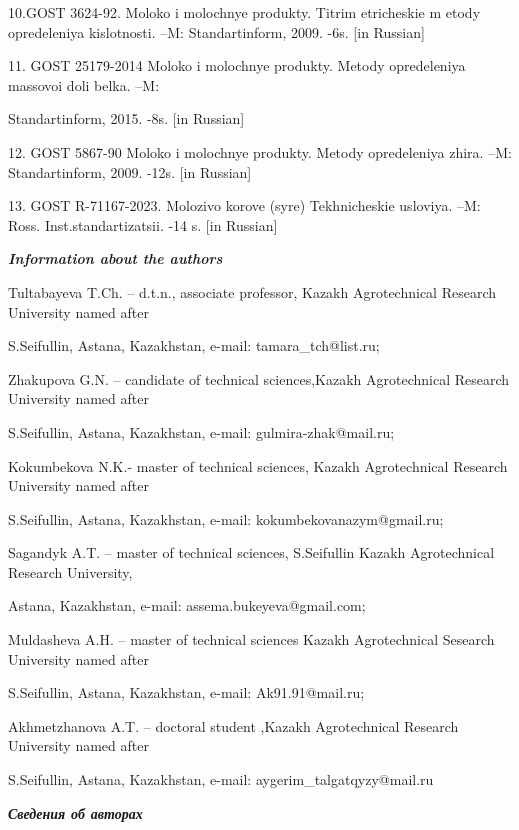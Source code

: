 \begin{noparindent}
10.GOST 3624-92. Moloko i molochnye produkty. Titrim etricheskie m etody
opredeleniya kislotnosti. --M: Standartinform, 2009. -6s. {[}in
Russian{]}

11. GOST 25179-2014 Moloko i molochnye produkty. Metody opredeleniya
massovoi doli belka. --M:

Standartinform, 2015. -8s. {[}in Russian{]}

12. GOST 5867-90 Moloko i molochnye produkty. Metody opredeleniya zhira.
--M: Standartinform, 2009. -12s. {[}in Russian{]}

13. GOST R-71167-2023. Molozivo korov\textquotesingle\textquotesingle e
(syr\textquotesingle\textquotesingle e) Tekhnicheskie usloviya. --M:
Ross. Inst.standartizatsii. -14 s. {[}in Russian{]}
\end{noparindent}

\emph{{\bfseries Information about the authors}}

\begin{noparindent}
Tultabayeva T.Ch. -- d.t.n., associate professor, Kazakh Agrotechnical
Research University named after

S.Seifullin, Astana, Kazakhstan, e-mail:
tamara\_tch@list.ru;

Zhakupova G.N. -- candidate of technical sciences,Kazakh Agrotechnical
Research University named after

S.Seifullin, Astana, Kazakhstan, e-mail:
gulmira-zhak@mail.ru;

Kokumbekova N.K.- master of technical sciences, Kazakh Agrotechnical
Research University named after

S.Seifullin, Astana, Kazakhstan, e-mail:
kokumbekovanazym@gmail.ru;

Sagandyk A.T. -- master of technical sciences, S.Seifullin Kazakh
Agrotechnical Research University,

Astana, Kazakhstan, e-mail:
assema.bukeyeva@gmail.com;

Muldasheva A.H. -- master of technical sciences Kazakh Agrotechnical
Sesearch University named after

S.Seifullin, Astana, Kazakhstan, e-mail:
Ak91.91@mail.ru;

Akhmetzhanova A.T. -- doctoral student ,Kazakh Agrotechnical Research
University named after

S.Seifullin, Astana, Kazakhstan, e-mail:
aygerim\_talgatqyzy@mail.ru
\end{noparindent}

\emph{{\bfseries Сведения об авторах}}

